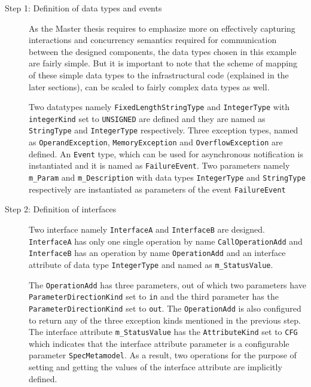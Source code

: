 \begin{description}
\item [Step 1: Definition of data types and events] As the Master thesis requires to emphasize more on effectively capturing interactions and concurrency semantics required for communication between the designed components, the data types chosen in this example are fairly simple. But it is important to note that the scheme of mapping of these simple data types to the infrastructural code (explained in the later sections), can be scaled to fairly complex data types as well.

Two datatypes namely \texttt{Fixed\allowbreak Length\allowbreak String\allowbreak Type} and \texttt{IntegerType} with \texttt{integerKind} set to \texttt{UNSIGNED} are defined and they are named as \texttt{StringType} and \texttt{IntegerType} respectively. Three exception types, named as \texttt{OperandException}, \texttt{MemoryException} and \texttt{Overflow\allowbreak Exception} are defined. An \texttt{Event} type, which can be used for asynchronous notification \cite{SpecMetamodel} is instantiated and it is named as \texttt{FailureEvent}. Two parameters namely \texttt{m\_Param} and \texttt{m\_Description} with data types \texttt{IntegerType} and \texttt{StringType} respectively are instantiated as parameters of the event \texttt{FailureEvent}

\item [Step 2: Definition of interfaces] Two interface namely \texttt{InterfaceA} and \texttt{InterfaceB} are designed. \texttt{InterfaceA} has only one single operation by name \texttt{CallOperationAdd} and \texttt{InterfaceB} has an operation by name \texttt{OperationAdd} and an interface attribute of data type \texttt{IntegerType} and named as \texttt{m\_StatusValue}.

The \texttt{OperationAdd} has three parameters, out of which two parameters have \texttt{Parameter\allowbreak Direction\allowbreak Kind} set to \texttt{in} and the third parameter has the \texttt{Parameter\allowbreak Direction\allowbreak Kind} set to \texttt{out}. The \texttt{OperationAdd} is also configured to return any of the three exception kinds mentioned in the previous step. The interface attribute \texttt{m\_StatusValue} has the \texttt{AttributeKind} set to \texttt{CFG} which indicates that the interface attribute parameter is a configurable parameter \texttt{SpecMetamodel}. As a result, two operations for the purpose of setting and getting the values of the interface attribute are implicitly defined.   


\end{description}
